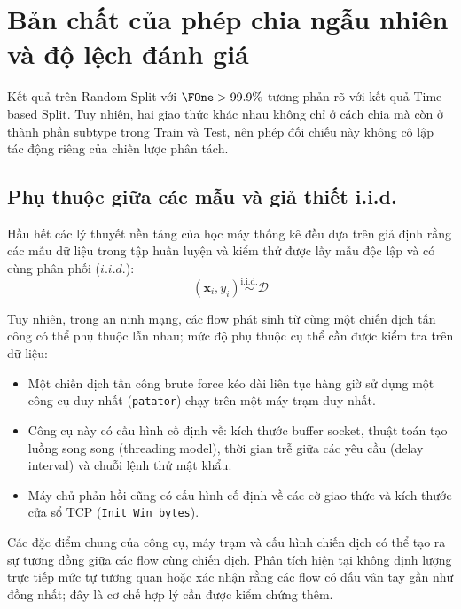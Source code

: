 
\section{Bản chất của phép chia ngẫu nhiên và độ lệch đánh giá}

Kết quả trên Random Split với $\FOne > 99.9\%$ tương phản rõ với kết quả Time-based Split. Tuy nhiên, hai giao thức khác nhau không chỉ ở cách chia mà còn ở thành phần subtype trong Train và Test, nên phép đối chiếu này không cô lập tác động riêng của chiến lược phân tách.

\subsection{Phụ thuộc giữa các mẫu và giả thiết i.i.d.}
Hầu hết các lý thuyết nền tảng của học máy thống kê đều dựa trên giả định rằng các mẫu dữ liệu trong tập huấn luyện và kiểm thử được lấy mẫu độc lập và có cùng phân phối ($i.i.d.$):
\begin{equation}
    (\mathbf{x}_i, y_i) \stackrel{\text{i.i.d.}}{\sim} \mathcal{D}
\end{equation}

Tuy nhiên, trong an ninh mạng, các flow phát sinh từ cùng một chiến dịch tấn công có thể phụ thuộc lẫn nhau; mức độ phụ thuộc cụ thể cần được kiểm tra trên dữ liệu:
\begin{itemize}
    \item Một chiến dịch tấn công brute force kéo dài liên tục hàng giờ sử dụng một công cụ duy nhất (\texttt{patator}) chạy trên một máy trạm duy nhất.
    \item Công cụ này có cấu hình cố định về: kích thước buffer socket, thuật toán tạo luồng song song (threading model), thời gian trễ giữa các yêu cầu (delay interval) và chuỗi lệnh thử mật khẩu.
    \item Máy chủ phản hồi cũng có cấu hình cố định về các cờ giao thức và kích thước cửa sổ TCP (\texttt{Init\_Win\_bytes}).
\end{itemize}

Các đặc điểm chung của công cụ, máy trạm và cấu hình chiến dịch có thể tạo ra sự tương đồng giữa các flow cùng chiến dịch. Phân tích hiện tại không định lượng trực tiếp mức tự tương quan hoặc xác nhận rằng các flow có dấu vân tay gần như đồng nhất; đây là cơ chế hợp lý cần được kiểm chứng thêm.

